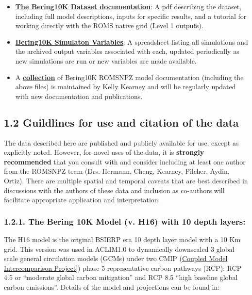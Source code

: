 \documentclass[
]{article}
\begin{document}
\begin{itemize}
\item
  \href{https://drive.google.com/file/d/1GlITTIvbs2gRBMNIxdDI15cZU6mH4ckg/view}{\textbf{The
  Bering10K Dataset documentation}}: A pdf describing the dataset,
  including full model descriptions, inputs for specific results, and a
  tutorial for working directly with the ROMS native grid (Level 1
  outputs).
\item
  \href{https://drive.google.com/file/d/1C1FCxRMBm0uBv2wEKwrGfHmLnjt_gFvG/view}{\textbf{Bering10K
  Simulaton Variables}}: A spreadsheet listing all simulations and the
  archived output variables associated with each, updated periodically
  as new simulations are run or new variables are made available.
\item
  A
  \href{https://beringnpz.github.io/roms-bering-sea/B10K-dataset-docs/}{\textbf{collection}}
  of Bering10K ROMSNPZ model documentation (including the above files)
  is maintained by \href{mailto:kelly.kearney@noaa.gov}{Kelly Kearney}
  and will be regularly updated with new documentation and publications.
\end{itemize}

\hypertarget{guildlines-for-use-and-citation-of-the-data}{%
\subsection{1.2 Guildlines for use and citation of the
data}\label{guildlines-for-use-and-citation-of-the-data}}

The data described here are published and publicly available for use,
except as explicitly noted. However, for novel uses of the data, it is
\textbf{strongly recommended} that you consult with and consider
including at least one author from the ROMSNPZ team (Drs. Hermann,
Cheng, Kearney, Pilcher, Aydin, Ortiz). There are multiple spatial and
temporal caveats that are best described in discussions with the authors
of these data and inclusion as co-authors will facilitate appropriate
application and interpretation.

\hypertarget{the-bering-10k-model-v.-h16-with-10-depth-layers}{%
\subsubsection{1.2.1. The Bering 10K Model (v. H16) with 10 depth
layers:}\label{the-bering-10k-model-v.-h16-with-10-depth-layers}}

The H16 model is the original BSIERP era 10 depth layer model with a 10
Km grid. This version was used in ACLIM1.0 to dynamically downscaled 3
global scale general circulation models (GCMs) under two CMIP
(\href{https://www.wcrp-climate.org/wgcm-cmip}{Coupled Model
Intercomparison Project}{]}) phase 5 representative carbon pathways
(RCP): RCP 4.5 or ``moderate global carbon mitigation'' and RCP 8.5
``high baseline global carbon emissions''. Details of the model and
projections can be found in:
\end{document}

